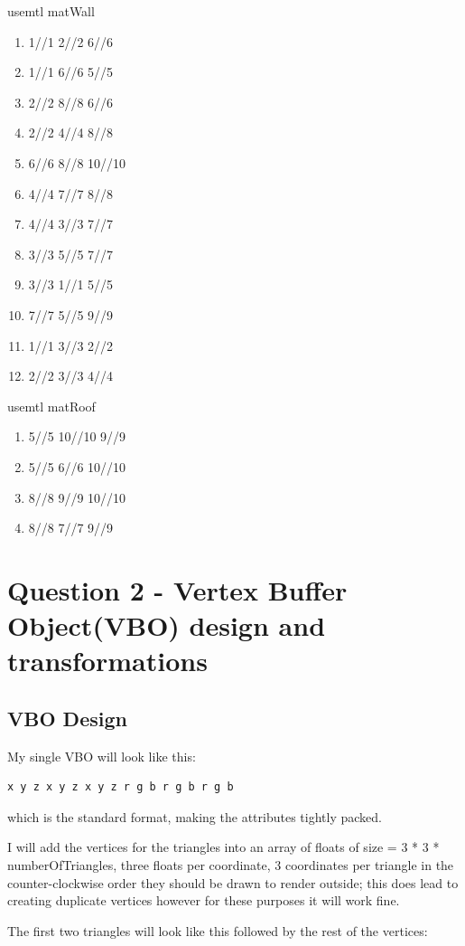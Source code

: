 \documentclass[10pt]{report}
\begin{document}
usemtl matWall
\begin{enumerate}[f]
    \item 1//1 2//2 6//6
    \item 1//1 6//6 5//5
    \item 2//2 8//8 6//6
    \item 2//2 4//4 8//8
    \item 6//6 8//8 10//10
    \item 4//4 7//7 8//8
    \item 4//4 3//3 7//7
    \item 3//3 5//5 7//7
    \item 3//3 1//1 5//5
    \item 7//7 5//5 9//9
    \item 1//1 3//3 2//2
    \item 2//2 3//3 4//4
\end{enumerate}
usemtl matRoof
\begin{enumerate}[f]
    \item 5//5 10//10 9//9
    \item 5//5 6//6 10//10
    \item 8//8 9//9 10//10
    \item 8//8 7//7 9//9
\end{enumerate}


\chapter{Question 2 - Vertex Buffer Object(VBO) design and transformations}

\section{VBO Design}

My single VBO will look like this:
\begin{verbatim}
x y z x y z x y z r g b r g b r g b
\end{verbatim}
which is the standard format, making the attributes tightly packed.

I will add the vertices for the triangles into an array of floats of size = 3 * 3 * numberOfTriangles, three floats per coordinate, 3 coordinates per triangle in the counter-clockwise order they should be drawn to render outside; this does lead to creating duplicate vertices however for these purposes it will work fine.

The first two triangles will look like this followed by the rest of the vertices:
\end{document}
